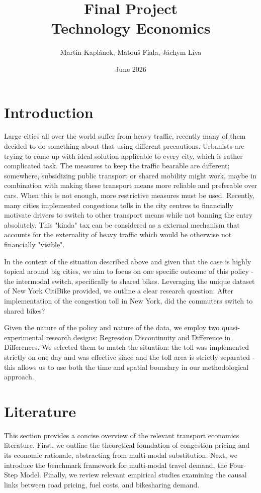\documentclass[10pt]{article}
\title{Final Project \\ Technology Economics}
\author{Martin Kapl\'{a}nek, Matou\v{s} Fiala, J\'{a}chym L\'{i}va}
\date{June 2026}
\begin{document}
\maketitle

\section{Introduction}

Large cities all over the world suffer from heavy traffic, recently many of them decided to do something about that using different precautions. Urbanists are trying to come up with ideal solution applicable to every city, which is rather complicated task. The measures to keep the traffic bearable are different; somewhere, subsidizing public transport or shared mobility might work, maybe in combination with making these transport means more reliable and preferable over cars. When this is not enough, more restrictive measures must be used. Recently, many cities implemented congestions tolls in the city centres to financially motivate drivers to switch to other transport means while not banning the entry absolutely. This "kinda" tax can be considered as a external mechanism that accounts for the externality of heavy traffic which would be otherwise not financially "visible". 

In the context of the situation described above and given that the case is highly topical around big cities, we aim to focus on one specific outcome of this policy - the intermodal switch, specifically to shared bikes. Leveraging the unique dataset of New York CitiBike provided, we outline a clear research question: After implementation of the congestion toll in New York, did the commuters switch to shared bikes?

Given the nature of the policy and nature of the data, we employ two quasi-experimental research designs: Regression Discontinuity and Difference in Differences. We selected them to match the situation: the toll was implemented strictly on one day and was effective since and the toll area is strictly separated - this allows us to use both the time and spatial boundary in our methodological approach. 

\section{Literature}

This section provides a concise overview of the relevant transport economics literature. First, we outline the theoretical foundation of congestion pricing and its economic rationale, abstracting from multi-modal substitution. Next, we introduce the benchmark framework for multi-modal travel demand, the Four-Step Model. Finally, we review relevant empirical studies examining the causal links between road pricing, fuel costs, and bikesharing demand.
\end{document}
